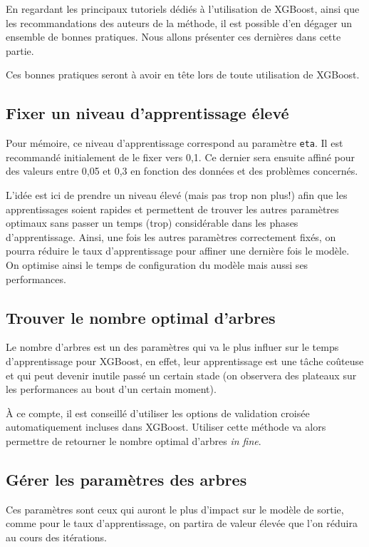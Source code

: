 \label{sec:bonnes-pratiques}
En regardant les principaux tutoriels dédiés à l'utilisation de XGBoost, ainsi que les recommandations des auteurs de la méthode, il est possible d'en dégager un ensemble de bonnes pratiques. Nous allons présenter ces dernières dans cette partie.

Ces bonnes pratiques seront à avoir en tête lors de toute utilisation de XGBoost.

\subsection{Fixer un niveau d'apprentissage élevé}
Pour mémoire, ce niveau d'apprentissage correspond au paramètre \texttt{eta}. Il est recommandé initialement de le fixer vers 0,1. Ce dernier sera ensuite affiné pour des valeurs entre 0,05 et 0,3 en fonction des données et des problèmes concernés.

L'idée est ici de prendre un niveau élevé (mais pas trop non plus!) afin que les apprentissages soient rapides et permettent de trouver les autres paramètres optimaux sans passer un temps (trop) considérable dans les phases d'apprentissage. Ainsi, une fois les autres paramètres correctement fixés, on pourra réduire le taux d'apprentissage pour affiner une dernière fois le modèle. On optimise ainsi le temps de configuration du modèle mais aussi ses performances.
\subsection{Trouver le nombre optimal d'arbres}
Le nombre d'arbres est un des paramètres qui va le plus influer sur le temps d'apprentissage pour XGBoost, en effet, leur apprentissage est une tâche coûteuse et qui peut devenir inutile passé un certain stade (on observera des plateaux sur les performances au bout d'un certain moment).

À ce compte, il est conseillé d'utiliser les options de validation croisée automatiquement incluses dans XGBoost. Utiliser cette méthode va alors permettre de retourner le nombre optimal d'arbres \textit{in fine}.

\subsection{Gérer les paramètres des arbres}Ces paramètres sont ceux qui auront le plus d'impact sur le modèle de sortie, comme pour le taux d'apprentissage, on partira de valeur élevée que l'on réduira au cours des itérations.


